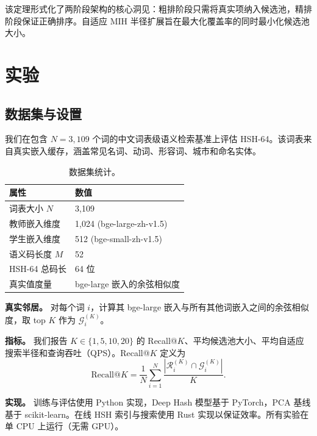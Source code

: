 \documentclass[11pt,a4paper]{article}
\begin{document}
该定理形式化了两阶段架构的核心洞见：粗排阶段只需将真实项纳入候选池，精排阶段保证正确排序。自适应 MIH 半径扩展旨在最大化覆盖率的同时最小化候选池大小。

\section{实验}

\subsection{数据集与设置}

我们在包含 $N=3{,}109$ 个词的中文词表级语义检索基准上评估 HSH-64。该词表来自真实嵌入缓存，涵盖常见名词、动词、形容词、城市和命名实体。

\begin{table}[htbp]
\centering
\caption{数据集统计。}
\label{tab:dataset-cn}
\begin{tabular}{ll}
\toprule
\textbf{属性} & \textbf{数值} \\
\midrule
词表大小 $N$ & 3,109 \\
教师嵌入维度 & 1,024 (bge-large-zh-v1.5) \\
学生嵌入维度 & 512 (bge-small-zh-v1.5) \\
语义码长度 $M$ & 52 \\
HSH-64 总码长 & 64 位 \\
真实值度量 & bge-large 嵌入的余弦相似度 \\
\bottomrule
\end{tabular}
\end{table}

\textbf{真实邻居。} 对每个词 $i$，计算其 bge-large 嵌入与所有其他词嵌入之间的余弦相似度，取 top $K$ 作为 $\mathcal{G}_i^{(K)}$。

\textbf{指标。} 我们报告 $K \in \{1, 5, 10, 20\}$ 的 Recall@$K$、平均候选池大小、平均自适应搜索半径和查询吞吐（QPS）。Recall@$K$ 定义为
\begin{equation}
    \text{Recall@}K = \frac{1}{N} \sum_{i=1}^{N} \frac{| \mathcal{R}_i^{(K)} \cap \mathcal{G}_i^{(K)} |}{K}.
\end{equation}

\textbf{实现。} 训练与评估使用 Python 实现，Deep Hash 模型基于 PyTorch，PCA 基线基于 scikit-learn。在线 HSH 索引与搜索使用 Rust 实现以保证效率。所有实验在单 CPU 上运行（无需 GPU）。
\end{document}
